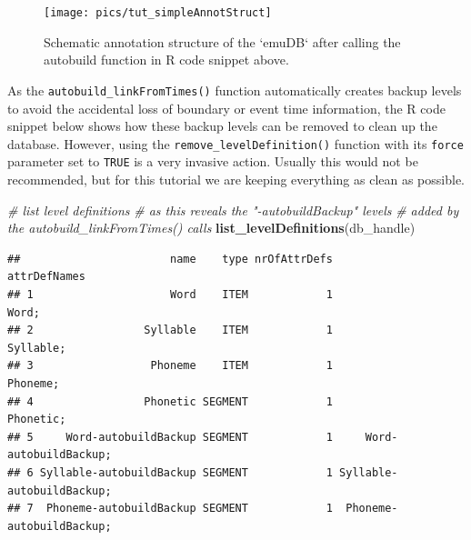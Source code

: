 \documentclass[]{book}
\newenvironment{Shaded}{\begin{snugshade}}{\end{snugshade}}
\newcommand{\CommentTok}[1]{\textcolor[rgb]{0.56,0.35,0.01}{\textit{#1}}}
\newcommand{\KeywordTok}[1]{\textcolor[rgb]{0.13,0.29,0.53}{\textbf{#1}}}
\newcommand{\NormalTok}[1]{#1}
\begin{document}
\begin{figure}

{\centering \texttt{[image: pics/tut\_simpleAnnotStruct]} 

}

\caption{Schematic annotation structure of the `emuDB` after calling the autobuild function in R code snippet above.}\label{fig:tutorial-simpleAnnotStruct}
\end{figure}

As the \texttt{autobuild\_linkFromTimes()} function automatically creates backup levels to avoid the accidental loss of boundary or event time information, the R code snippet below shows how these backup levels can be removed to clean up the database. However, using the \texttt{remove\_levelDefinition()} function with its \texttt{force} parameter set to \texttt{TRUE} is a very invasive action. Usually this would not be recommended, but for this tutorial we are keeping everything as clean as possible.

\begin{Shaded}
\begin{Highlighting}[]
\CommentTok{# list level definitions}
\CommentTok{# as this reveals the "-autobuildBackup" levels}
\CommentTok{# added by the autobuild_linkFromTimes() calls}
\KeywordTok{list_levelDefinitions}\NormalTok{(db_handle)}
\end{Highlighting}
\end{Shaded}

\begin{verbatim}
##                       name    type nrOfAttrDefs              attrDefNames
## 1                     Word    ITEM            1                     Word;
## 2                 Syllable    ITEM            1                 Syllable;
## 3                  Phoneme    ITEM            1                  Phoneme;
## 4                 Phonetic SEGMENT            1                 Phonetic;
## 5     Word-autobuildBackup SEGMENT            1     Word-autobuildBackup;
## 6 Syllable-autobuildBackup SEGMENT            1 Syllable-autobuildBackup;
## 7  Phoneme-autobuildBackup SEGMENT            1  Phoneme-autobuildBackup;
\end{verbatim}
\end{document}
